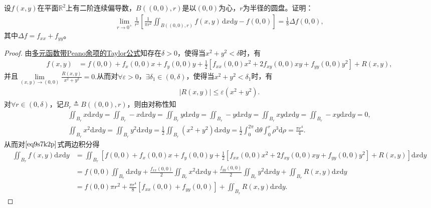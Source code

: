 \documentclass[../../main.tex]{subfiles}%
\begin{document}
\begin{example}
设$f(x,y)$在平面$\mathbb{R}^2$上有二阶连续偏导数，$B((0,0),r)$是以$(0,0)$为心，$r$为半径的圆盘。证明：
\begin{align*}
\lim\limits_{r \to 0^+} \frac{1}{r^2} \left[ \frac{1}{\pi r^2} \iint_{B((0,0),r)} f(x,y) \, \mathrm{d}x\mathrm{d}y - f(0,0) \right] = \frac{1}{8} \Delta f(0,0),
\end{align*}
其中$\Delta f = f_{xx} + f_{yy}$。
\end{example}
\begin{proof}
由\hyperref[theorem:多元函数带Peano余项的Taylor公式]{多元函数带Peano余项的Taylor公式}知存在$\delta >0$，使得当$x^2+y^2<\delta$时，有
\begin{align}
f(x,y) &= f(0,0) + f_x(0,0)x + f_y(0,0)y + \frac{1}{2}\left[ f_{xx}(0,0)x^2 + 2f_{xy}(0,0)xy + f_{yy}(0,0)y^2 \right] + R(x,y), \label{eq9s7k2p}
\end{align}
并且$\lim\limits_{(x,y) \to (0,0)} \frac{R(x,y)}{x^2+y^2}=0.$从而对$\forall \varepsilon >0$，$\exists \delta_1 \in (0,\delta)$，使得当$x^2+y^2<\delta_1$时，有
\begin{align}
|R(x,y)| \leqslant \varepsilon (x^2+y^2). \label{eq4z8m1n}
\end{align}
对$\forall r \in (0,\delta)$，记$B_r \triangleq B((0,0),r)$，则由对称性知
\begin{gather*}
\iint_{B_r} x\mathrm{d}x\mathrm{d}y=\iint_{B_r} -x\mathrm{d}x\mathrm{d}y=\iint_{B_r} y\mathrm{d}x\mathrm{d}y=\iint_{B_r} -y\mathrm{d}x\mathrm{d}y=\iint_{B_r} xy\mathrm{d}x\mathrm{d}y=\iint_{B_r} -xy\mathrm{d}x\mathrm{d}y=0, \\
\iint_{B_r} x^2\mathrm{d}x\mathrm{d}y=\iint_{B_r} y^2\mathrm{d}x\mathrm{d}y=\frac{1}{2}\iint_{B_r} (x^2+y^2)\mathrm{d}x\mathrm{d}y=\frac{1}{2}\int_0^{2\pi}\mathrm{d}\theta \int_0^r \rho^3\mathrm{d}\rho=\frac{\pi r^4}{4}.
\end{gather*}
从而对$\eqref{eq9s7k2p}$式两边积分得
\begin{align}
\iint_{B_r} f(x,y)\mathrm{d}x\mathrm{d}y &= \iint_{B_r} \left[ f(0,0) + f_x(0,0)x + f_y(0,0)y + \frac{1}{2}\left[ f_{xx}(0,0)x^2 + 2f_{xy}(0,0)xy + f_{yy}(0,0)y^2 \right] + R(x,y) \right] \mathrm{d}x\mathrm{d}y \nonumber \\
&= f(0,0)\iint_{B_r}\mathrm{d}x\mathrm{d}y + \frac{f_{xx}(0,0)}{2}\iint_{B_r}x^2\mathrm{d}x\mathrm{d}y + \frac{f_{yy}(0,0)}{2}\iint_{B_r}y^2\mathrm{d}x\mathrm{d}y + \iint_{B_r}R(x,y)\mathrm{d}x\mathrm{d}y \nonumber \\
&= f(0,0)\pi r^2 + \frac{\pi r^4}{8}\left[ f_{xx}(0,0) + f_{yy}(0,0) \right] + \iint_{B_r}R(x,y)\mathrm{d}x\mathrm{d}y. \label{eq7d3s6f}

\end{align}
\end{proof}
\end{document}
